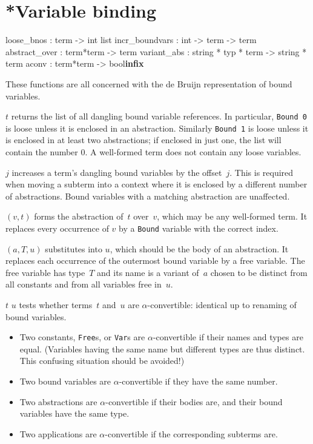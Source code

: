 \section{*Variable binding}
\begin{ttbox}
loose_bnos     : term -> int list
incr_boundvars : int -> term -> term
abstract_over  : term*term -> term
variant_abs    : string * typ * term -> string * term
aconv          : term*term -> bool\hfill{\bf infix}
\end{ttbox}
These functions are all concerned with the de Bruijn representation of
bound variables.
\begin{ttdescription}
\item[\ttindexbold{loose_bnos} $t$]
  returns the list of all dangling bound variable references.  In
  particular, {\tt Bound~0} is loose unless it is enclosed in an
  abstraction.  Similarly {\tt Bound~1} is loose unless it is enclosed in
  at least two abstractions; if enclosed in just one, the list will contain
  the number 0.  A well-formed term does not contain any loose variables.

\item[\ttindexbold{incr_boundvars} $j$]
  increases a term's dangling bound variables by the offset~$j$.  This is
  required when moving a subterm into a context where it is enclosed by a
  different number of abstractions.  Bound variables with a matching
  abstraction are unaffected.

\item[\ttindexbold{abstract_over} $(v,t)$]
  forms the abstraction of~$t$ over~$v$, which may be any well-formed term.
  It replaces every occurrence of \(v\) by a {\tt Bound} variable with the
  correct index.

\item[\ttindexbold{variant_abs} $(a,T,u)$]
  substitutes into $u$, which should be the body of an abstraction.
  It replaces each occurrence of the outermost bound variable by a free
  variable.  The free variable has type~$T$ and its name is a variant
  of~$a$ chosen to be distinct from all constants and from all variables
  free in~$u$.

\item[$t$ \ttindexbold{aconv} $u$]
  tests whether terms~$t$ and~$u$ are \(\alpha\)-convertible: identical up
  to renaming of bound variables.
\begin{itemize}
  \item
    Two constants, {\tt Free}s, or {\tt Var}s are \(\alpha\)-convertible
    if their names and types are equal.
    (Variables having the same name but different types are thus distinct.
    This confusing situation should be avoided!)
  \item
    Two bound variables are \(\alpha\)-convertible
    if they have the same number.
  \item
    Two abstractions are \(\alpha\)-convertible
    if their bodies are, and their bound variables have the same type.
  \item
    Two applications are \(\alpha\)-convertible
    if the corresponding subterms are.
\end{itemize}

\end{ttdescription}

